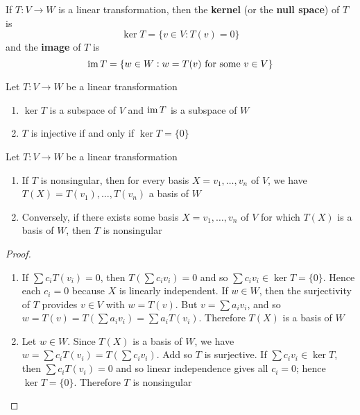 \documentclass[11pt]{article}
\begin{document}
\begin{definition}[]
If \(T:V\to W\) is a linear transformation, then the \textbf{kernel} (or the \textbf{null
space}) of \(T\) is
\begin{equation*}
\ker T=\{v\in V:T(v)=0\}
\end{equation*}
and the \textbf{image} of \(T\) is
\begin{equation*}
\operatorname{im} T=\{w\in W:w=T(v)\text{ for some }v\in V\}
\end{equation*}
\end{definition}

\begin{proposition}[]
Let \(T:V\to W\) be a linear transformation
\begin{enumerate}
\item \(\ker T\) is a subspace of \(V\) and \(\operatorname{im} T\) is a subspace of \(W\)
\item \(T\) is injective if and only if \(\ker T=\{0\}\)
\end{enumerate}
\end{proposition}

\begin{lemma}[]
\label{lemma3.103}
Let \(T:V\to W\) be a linear transformation
\begin{enumerate}
\item If \(T\) is nonsingular, then for every basis \(X=v_1,\dots,v_n\) of \(V\),
we have \(T(X)=T(v_1),\dots,T(v_n)\) a basis of \(W\)
\item Conversely, if there exists some basis \(X=v_1,\dots,v_n\) of \(V\) for
which \(T(X)\) is a basis of \(W\), then \(T\) is nonsingular
\end{enumerate}
\end{lemma}
\begin{proof}
\begin{enumerate}
\item If \(\sum c_iT(v_i)=0\), then \(T(\sum c_iv_i)=0\) and so 
\(\sum c_iv_i\in\ker T=\{0\}\). Hence each \(c_i=0\) because \(X\) is linearly
independent. If \(w\in W\), then the surjectivity of \(T\) provides \(v\in V\)
with \(w=T(v)\). But \(v=\sum a_iv_i\), and so 
\(w=T(v)=T(\sum a_iv_i)=\sum a_iT(v_i)\). Therefore \(T(X)\) is a basis of
\(W\)
\item Let \(w\in W\). Since \(T(X)\) is a basis of \(W\), we have 
\(w=\sum c_iT(v_i)=T(\sum c_iv_i)\). Add so \(T\) is surjective. If 
\(\sum c_iv_i\in\ker T\), then \(\sum c_iT(v_i)=0\) and so linear
independence gives all \(c_i=0\); hence \(\ker T=\{0\}\). Therefore \(T\)
is nonsingular
\end{enumerate}
\end{proof}
\end{document}
